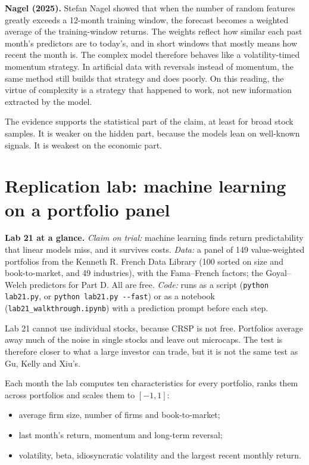 \textbf{Nagel (2025).} Stefan Nagel showed that when the number of random features greatly exceeds a 12-month training window, the forecast becomes a weighted average of the training-window returns. The weights reflect how similar each past month's predictors are to today's, and in short windows that mostly means how recent the month is. The complex model therefore behaves like a volatility-timed momentum strategy. In artificial data with reversals instead of momentum, the same method still builds that strategy and does poorly. On this reading, the virtue of complexity is a strategy that happened to work, not new information extracted by the model.

The evidence supports the statistical part of the claim, at least for broad stock samples. It is weaker on the hidden part, because the models lean on well-known signals. It is weakest on the economic part.

\section{Replication lab: machine learning on a portfolio panel}
\label{sec:21-lab}

\begin{callout}
\textbf{Lab 21 at a glance.} \emph{Claim on trial:} machine learning finds return predictability that linear models miss, and it survives costs. \emph{Data:} a panel of 149 value-weighted portfolios from the Kenneth R. French Data Library (100 sorted on size and book-to-market, and 49 industries), with the Fama--French factors; the Goyal--Welch predictors for Part D. All are free. \emph{Code:} runs as a script (\texttt{python lab21.py}, or \texttt{python lab21.py -{}-fast}) or as a notebook (\texttt{lab21\_walkthrough.ipynb}) with a prediction prompt before each step.
\end{callout}

Lab 21 cannot use individual stocks, because CRSP is not free. Portfolios average away much of the noise in single stocks and leave out microcaps. The test is therefore closer to what a large investor can trade, but it is not the same test as Gu, Kelly and Xiu's.

Each month the lab computes ten characteristics for every portfolio, ranks them across portfolios and scales them to $[-1, 1]$:

\begin{itemize}
  \item average firm size, number of firms and book-to-market;
  \item last month's return, momentum and long-term reversal;
  \item volatility, beta, idiosyncratic volatility and the largest recent monthly return.
\end{itemize}

